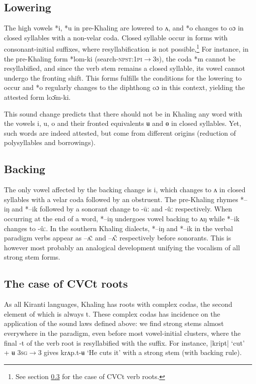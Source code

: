 \documentclass[oldfontcommands,oneside,a4paper,11pt]{article}
\newcommand{\ipa}[1]{{\phon \mbox{#1}}} %
\begin{document}
\subsection{Lowering} \label{sec:lowering}
The high vowels *\ipa{i}, *\ipa{u}   in pre-Khaling are lowered to \ipa{ʌ},  and   *\ipa{o} changes to \ipa{oɔ} in closed syllables with a non-velar coda. Closed syllable occur in forms with consonant-initial suffixes, where resyllabification is not possible,\footnote{See section \ref{sec:cvct} for the case of CVCt verb roots.} For instance, in the pre-Khaling form *\ipa{lom-ki} (search-\textsc{npst:1pi$\rightarrow$3s}), the coda *\ipa{m} cannot be resyllabified, and since the verb stem remains a closed syllable, its vowel cannot undergo the fronting shift. This forms fulfills the conditions for the lowering to occur and *\ipa{o} regularly changes to the diphthong \ipa{oɔ} in this context, yielding the attested form \ipa{loɔ̄m-ki}.


This sound change predicts that there should not be in Khaling any word with the vowels \ipa{i}, \ipa{u}, \ipa{o} and their fronted equivalents \ipa{ʉ} and \ipa{ɵ} in closed syllables. Yet, such words are indeed attested, but come from different origins (reduction of polysyllables and borrowings).

\subsection{Backing} \label{sec:backing}
The only vowel affected by the backing change is \ipa{i}, which changes to \ipa{ʌ} in closed syllables with a velar coda followed by an obstruent. The pre-Khaling rhymes *\ipa{--iŋ} and *\ipa{--ik}  followed by a sonorant change to \ipa{-ūː} and \ipa{-ûː} respectively. When occurring at the end of a word, *\ipa{--iŋ} undergoes vowel backing to \ipa{ʌŋ} while *\ipa{--ik}  changes to \ipa{-ûː}. In the southern Khaling dialects,  *\ipa{--iŋ} and *\ipa{--ik} in the verbal paradigm verbs appear as \ipa{--ʌ̄ː} and  \ipa{--ʌ̂ː} respectively before sonorants. This is however most probably an analogical development unifying the vocalism of all strong stem forms.


\subsection{The case of CVCt roots} \label{sec:cvct}
As all Kiranti languages, Khaling has roots with complex codas, the second element of which is always \ipa{t}. These complex codas has incidence on the application of the sound laws defined above: we find strong stems almost everywhere in the paradigm, even before most vowel-initial clusters, where the final \ipa{-t} of the verb root is resyllabified with the suffix. For instance,  |kript| `cut' + \ipa{ʉ} \textsc{3sg$\rightarrow$3} gives \ipa{krʌp.t-ʉ} `He cuts it' with a strong stem (with backing rule).
\end{document}
